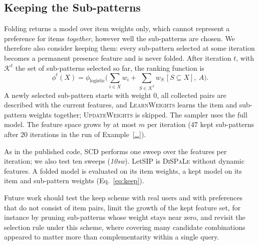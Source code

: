 \subsection{Keeping the Sub-patterns}
\label{subsec:keep}
Folding returns a model over item weights only, which cannot represent a preference for items
\emph{together}, however well the sub-patterns are chosen. We therefore also consider keeping them: every
sub-pattern selected at some iteration becomes a permanent presence feature and is never folded. After
iteration $t$, with $\mathcal K^t$ the set of sub-patterns selected so far, the ranking function is
\begin{equation}\label{eq:keep}
  \phi^t(X) = \phi_{\mathrm{logistic}}\Big(\sum_{i \in X} w_i + \sum_{S \in \mathcal K^t} w_S\,[S \subseteq X],\ A\Big).
\end{equation}
A newly selected sub-pattern starts with weight $0$, all collected pairs are described with the current
features, and \textsc{LearnWeights} learns the item and sub-pattern weights together; \textsc{UpdateWeights}
is skipped. The sampler uses the full model. The feature space grows by at most $m$ per iteration ($47$ kept
sub-patterns after $20$ iterations in the run of Example~\ref{…}).


As in the published code, SCD performs one sweep over the features per iteration; we also test ten sweeps
(\emph{10sw}). LetSIP is \textsc{DiSPaLe} without dynamic features. A folded model is evaluated on its item
weights, a kept model on its item and sub-pattern weights (Eq.~\eqref{eq:keep}).


Future work should test the keep scheme with real users and with preferences that do not consist of item
pairs, limit the growth of the kept feature set, for instance by pruning sub-patterns whose weight stays near
zero, and revisit the selection rule under this scheme, where covering many candidate combinations appeared to
matter more than complementarity within a single query.



